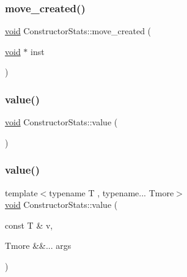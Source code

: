 \mbox{\label{class_constructor_stats_a72e330786f57958b5a829357c2ffacbd}} 
\subsubsection{\texorpdfstring{move\_created()}{move\_created()}}
{\footnotesize\ttfamily \mbox{\hyperlink{_s_d_l__opengles2__gl2ext_8h_ae5d8fa23ad07c48bb609509eae494c95}{void}} Constructor\+Stats\+::move\+\_\+created (\begin{DoxyParamCaption}\item[{\mbox{\hyperlink{_s_d_l__opengles2__gl2ext_8h_ae5d8fa23ad07c48bb609509eae494c95}{void}} $\ast$}]{inst }\end{DoxyParamCaption})\hspace{0.3cm}{\ttfamily [inline]}}

\mbox{\label{class_constructor_stats_aa8b4d906166182a711c72c68b199efcf}} 
\subsubsection{\texorpdfstring{value()}{value()}\hspace{0.1cm}{\footnotesize\ttfamily [1/2]}}
{\footnotesize\ttfamily \mbox{\hyperlink{_s_d_l__opengles2__gl2ext_8h_ae5d8fa23ad07c48bb609509eae494c95}{void}} Constructor\+Stats\+::value (\begin{DoxyParamCaption}{ }\end{DoxyParamCaption})\hspace{0.3cm}{\ttfamily [inline]}}

\mbox{\label{class_constructor_stats_a12d3e90daf9fe41b09fa8d2bd970d664}} 
\subsubsection{\texorpdfstring{value()}{value()}\hspace{0.1cm}{\footnotesize\ttfamily [2/2]}}
{\footnotesize\ttfamily template$<$typename T , typename... Tmore$>$ \\
\mbox{\hyperlink{_s_d_l__opengles2__gl2ext_8h_ae5d8fa23ad07c48bb609509eae494c95}{void}} Constructor\+Stats\+::value (\begin{DoxyParamCaption}\item[{const T \&}]{v,  }\item[{Tmore \&\&...}]{args }\end{DoxyParamCaption})\hspace{0.3cm}{\ttfamily [inline]}}


